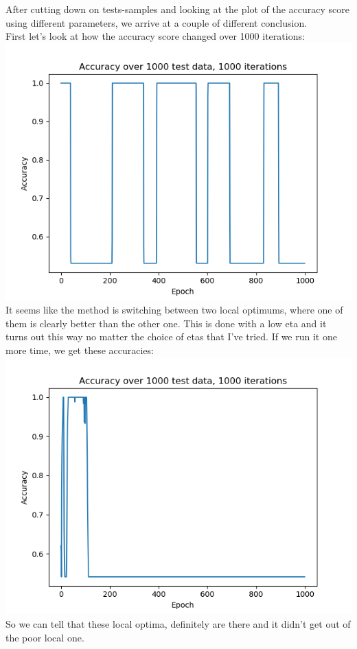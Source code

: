 \documentclass[a4paper,norsk]{article}
\begin{document}
After cutting down on tests-samples and looking at the plot of the accuracy score using different parameters, we arrive at a couple of different conclusion.\\
First let's look at how the accuracy score changed over 1000 iterations:\\
\includegraphics[scale=.7]{images/logplots/1000iter1}\\
It seems like the method is switching between two local optimums, where one of them is clearly better than the other one. This is done with a low eta and it turns out this way no matter the choice of etas that I've tried. If we run it one more time, we get these accuracies:\\
\includegraphics[scale=.7]{images/logplots/1000iter2}\\
So we can tell that these local optima, definitely are there and it didn't get out of the poor local one.
\end{document}
